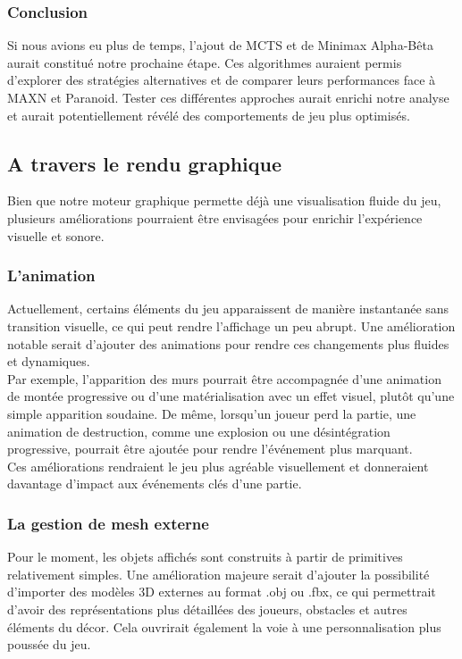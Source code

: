 \subsubsection{Conclusion}
Si nous avions eu plus de temps, l’ajout de MCTS et de Minimax Alpha-Bêta aurait constitué notre prochaine étape. Ces algorithmes auraient permis d’explorer des stratégies alternatives et de comparer leurs performances face à MAXN et Paranoid. Tester ces différentes approches aurait enrichi notre analyse et aurait potentiellement révélé des comportements de jeu plus optimisés.

\subsection{A travers le rendu graphique}
Bien que notre moteur graphique permette déjà une visualisation fluide du jeu, plusieurs améliorations pourraient être envisagées pour enrichir l’expérience visuelle et sonore.
\subsubsection{L'animation}
Actuellement, certains éléments du jeu apparaissent de manière instantanée sans transition visuelle, ce qui peut rendre l'affichage un peu abrupt. Une amélioration notable serait d'ajouter des animations pour rendre ces changements plus fluides et dynamiques. \\
Par exemple, l’apparition des murs pourrait être accompagnée d’une animation de montée progressive ou d’une matérialisation avec un effet visuel, plutôt qu’une simple apparition soudaine. De même, lorsqu’un joueur perd la partie, une animation de destruction, comme une explosion ou une désintégration progressive, pourrait être ajoutée pour rendre l’événement plus marquant. \\
Ces améliorations rendraient le jeu plus agréable visuellement et donneraient davantage d’impact aux événements clés d’une partie.
\subsubsection{La gestion de mesh externe}
Pour le moment, les objets affichés sont construits à partir de primitives relativement simples. Une amélioration majeure serait d’ajouter la possibilité d’importer des modèles 3D externes au format .obj ou .fbx, ce qui permettrait d’avoir des représentations plus détaillées des joueurs, obstacles et autres éléments du décor. Cela ouvrirait également la voie à une personnalisation plus poussée du jeu.

